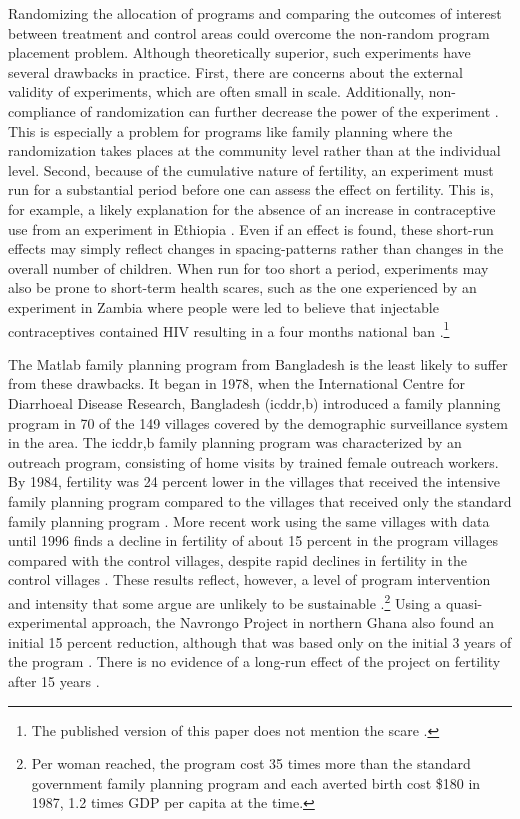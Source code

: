 Randomizing the allocation of programs and comparing the outcomes of interest between treatment and control areas could overcome the non-random program placement problem. Although theoretically superior, such experiments have several drawbacks in practice. First, there are concerns about the external validity of experiments, which are often small in scale. Additionally, non-compliance of randomization can further decrease the power of the experiment \citep{Desai2011}. This is especially a problem for programs like family planning where the randomization takes places at the community level rather than at the individual level. Second, because of the cumulative nature of fertility, an experiment must run for a substantial period before one can assess the effect on fertility. This is, for example, a likely explanation for the absence of an increase in contraceptive use from an experiment in Ethiopia \citep{Desai2011}. Even if an effect is found, these short-run effects may simply reflect changes in spacing-patterns rather than changes in the overall number of children. When run for too short a period, experiments may also be prone to short-term health scares, such as the one experienced by an experiment in Zambia where people were led to believe that injectable contraceptives contained HIV resulting in a four months national ban \citep{Ashraf2009}.\footnote{The published version of this paper does not mention the scare \citep{Ashraf2014}.}

The Matlab family planning program from Bangladesh is the least likely to suffer from these drawbacks. It began in 1978, when the International Centre for Diarrhoeal Disease Research, Bangladesh (icddr,b) introduced a family planning program in 70 of the 149 villages covered by the demographic surveillance system in the area. The icddr,b family planning program was characterized by an outreach program, consisting of home visits by trained female outreach workers. By 1984, fertility was 24 percent lower in the villages that received the intensive family planning program compared to the villages that received only the standard family planning program \citep{Phillips1988}. More recent work using the same villages with data until 1996 finds a decline in fertility of about 15 percent in the program villages compared with the control villages, despite rapid declines in fertility in the control villages \citep{Sinha2005,Joshi2007}. These results reflect, however, a level of program intervention and intensity that some argue are unlikely to be sustainable \citep{pritchett94a}.\footnote{Per woman reached, the program cost 35 times more than the standard government family planning program and each averted birth cost \$180 in 1987, 1.2 times GDP per capita at the time.} Using a quasi-experimental approach, the Navrongo Project in northern Ghana also found an initial 15 percent reduction, although that was based only on the initial 3 years of the program \citep{Debpuur2002}. There is no evidence of a long-run effect of the project on fertility after 15 years \citep{Phillips2012}.

